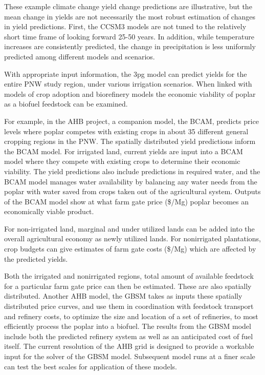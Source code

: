 \documentclass[preprint,12pt]{elsarticle}
\begin{document}
These example climate change yield change predictions are
illustrative, but the mean change in yields are not necessarily the
most robust estimation of changes in yield predictions.  First, the
\ac{CCSM3} models are not tuned to the relatively short time frame of
looking forward 25-50 years.  In addition, while temperature increases
are consistently predicted, the change in precipitation is less
uniformly predicted among different models and scenarios. 

With appropriate input information, the \ac{3pg} model can predict
yields for the entire \ac{PNW} study region, under various irrigation
scenarios.  When linked with models of crop adoption and biorefinery
models the economic viability of poplar as a biofuel feedstock can be
examined.
 
For example, in the \ac{AHB} project, a companion model, the
\acf{BCAM}, predicts price levels where poplar competes with existing
crops in about 35 different general cropping regions in the \ac{PNW}.
The spatially distributed yield predictions inform the \ac{BCAM}
model.  For irrigated land, current yields are input into a \ac{BCAM}
model where they compete with existing crops to determine their
economic viability.  The yield predictions also include predictions in
required water, and the \ac{BCAM} model manages water availability by
balancing any water needs from the poplar with water saved from crops
taken out of the agricultural system.  Outputs of the \ac{BCAM} model
show at what farm gate price (\$/Mg) poplar becomes an economically
viable product.
 
For non-irrigated land, marginal and under utilized lands can be added
into the overall agricultural economy as newly utilized lands.  For
nonirrigated plantations, crop budgets can give estimates of farm gate
costs (\$/Mg) which are affected by the predicted yields.

Both the irrigated and nonirrigated regions, total amount of available
feedstock for a particular farm gate price can then be estimated.
These are also spatially distributed.  Another \ac{AHB} model, the
\acf{GBSM} takes as inputs these spatially distributed price curves,
and use them in coordination with feedstock transport and refinery
costs, to optimize the size and location of a set of refineries, to
most efficiently process the poplar into a biofuel.  The results from
the \ac{GBSM} model include both the predicted refinery system as well
as an anticipated cost of fuel itself.  The current resolution of the
\ac{AHB} grid is designed to provide a workable input for the solver
of the \ac{GBSM} model.  Subsequent model runs at a finer scale can
test the best scales for application of these models.
\end{document}
